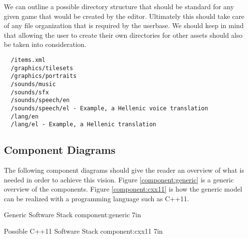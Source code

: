 We can outline a possible directory structure that should be standard for any
given game that would be created by the editor. Ultimately this should take
care of any file organization that is required by the userbase. We should keep
in mind that allowing the user to create their own directories for other assets
should also be taken into consideration.

\begin{lstlisting}
  /items.xml
  /graphics/tilesets
  /graphics/portraits
  /sounds/music
  /sounds/sfx
  /sounds/speech/en
  /sounds/speech/el - Example, a Hellenic voice translation
  /lang/en
  /lang/el - Example, a Hellenic translation
\end{lstlisting}

\subsection{Component Diagrams}

The following component diagrams should give the reader an overview of what is
needed in order to achieve this vision. Figure \ref{component:generic} is a
generic overview of the components. Figure \ref{component:cxx11} is how the 
generic model can be realized with a programming language such as C++11.

%
       {Generic Software Stack}%
       {component:generic}%
       {7in}

%
       {Possible C++11 Software Stack}%
       {component:cxx11}%
       {7in}

